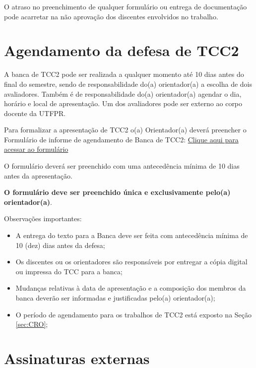 \documentclass[a4paper, 12pt]{article}
\begin{document}
	O atraso no preenchimento de qualquer formulário ou entrega de documentação pode acarretar na não aprovação dos discentes envolvidos no trabalho.    
        
   \section{Agendamento da defesa de TCC2}

    A banca de TCC2 pode ser realizada a qualquer momento até 10 dias antes do final do semestre, sendo de responsabilidade do(a) orientador(a) a escolha de dois avaliadores. Também é de responsabilidade do(a) orientador(a) agendar o dia, horário e local de apresentação. Um dos avaliadores pode ser externo ao corpo docente da UTFPR.
    
    Para formalizar a apresentação de TCC2 o(a) Orientador(a) deverá preencher o Formulário de informe de agendamento de Banca de TCC2: \href{https://forms.gle/QVNraTXAZ27V1xSK8}{Clique aqui para acessar ao formulário}
    
    O formulário deverá ser preenchido com uma antecedência mínima de 10 dias antes da apresentação.
    
    \textbf{O formulário deve ser preenchido única e exclusivamente pelo(a) orientador(a)}.
		
    Observações importantes:
    
    \begin{itemize}
    	\item A entrega do texto para a Banca deve ser feita com antecedência mínima de 10 (dez) dias antes da defesa;
    	\item Os discentes ou os orientadores são responsáveis por entregar a cópia digital ou impressa do TCC para a banca;
    	\item Mudanças relativas à data de apresentação e a composição dos membros da banca deverão ser informadas e justificadas pelo(a) orientador(a);
    	\item O período de agendamento para os trabalhos de TCC2 está exposto na Seção \ref{sec:CRO};
    \end{itemize}

	\section{Assinaturas externas}
	
\end{document}

